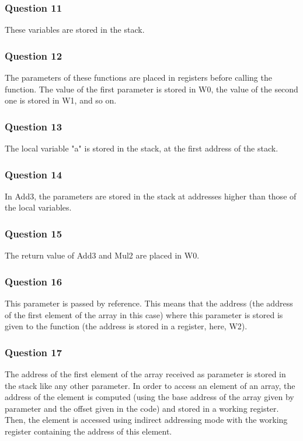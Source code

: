 \documentclass[a4paper,10pt]{article}
\begin{document}
\subsubsection*{Question 11}
These variables are stored in the stack.

\subsubsection*{Question 12}
The parameters of these functions are placed in registers before calling the function. The value of the first parameter is stored in W0, the value of the second one is stored in W1, and so on.

\subsubsection*{Question 13}
The local variable "a" is stored in the stack, at the first address of the stack.

\subsubsection*{Question 14}
In Add3, the parameters are stored in the stack at addresses higher than those of the local variables.

\subsubsection*{Question 15}
The return value of Add3 and Mul2 are placed in W0.

\subsubsection*{Question 16}
This parameter is passed by reference. This means that the address (the address of the first element of the array in this case) where this parameter is stored is given to the function (the address is stored in a register, here, W2).

\subsubsection*{Question 17}
The address of the first element of the array received as parameter is stored in the stack like any other parameter. In order to access an element of an array, the address of the element is computed (using the base address of the array given by parameter and the offset given in the code) and stored in a working register. Then, the element is accessed using indirect addressing mode with the working register containing the address of this element.
\end{document}
